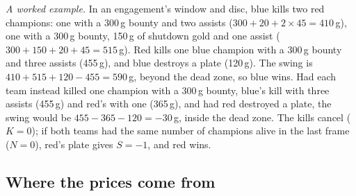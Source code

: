 
\emph{A worked example.} In an engagement's window and disc, blue kills two red champions: one with
a 300\,g bounty and two assists ($300 + 20 + 2 \times 45 = 410$\,g), one with a 300\,g bounty,
150\,g of shutdown gold and one assist ($300 + 150 + 20 + 45 = 515$\,g). Red kills one blue champion
with a 300\,g bounty and three assists (455\,g), and blue destroys a plate (120\,g). The swing is
$410 + 515 + 120 - 455 = 590$\,g, beyond the dead zone, so blue wins. Had each team instead killed one
champion with a 300\,g bounty, blue's kill with three assists (455\,g) and red's with one (365\,g),
and had red destroyed a plate, the swing would be $455 - 365 - 120 = -30$\,g, inside the dead zone.
The kills cancel ($K = 0$); if both teams had the same number of champions alive in the last frame
($N = 0$), red's plate gives $S = -1$, and red wins.

\subsection{Where the prices come from}\label{sec:label-prices}


